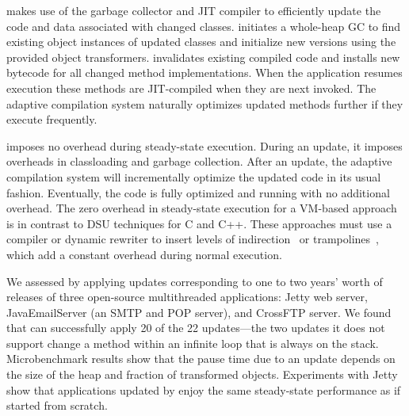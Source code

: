 \DSU{} makes use of the garbage collector and JIT compiler to
efficiently update the code and data associated with changed classes.
\DSU{} initiates a whole-heap GC to find existing object
instances of updated classes and initialize new versions using the
provided object transformers.  \DSU{} invalidates existing compiled 
code and installs new bytecode for all changed method implementations.
When the application resumes execution these methods
are JIT-compiled when they are next invoked.
The adaptive compilation system naturally optimizes updated methods
further if they execute frequently.

\DSU{} imposes no overhead during steady-state execution.  During an
update, it imposes overheads in 
classloading and garbage collection. After an update, the adaptive
compilation system will incrementally optimize the updated code in its
usual fashion.  Eventually, the code is fully optimized and running
with no additional overhead.  The zero overhead in steady-state
execution for a
VM-based approach is in contrast to DSU techniques for C and C++. These
approaches
must use a compiler or dynamic rewriter to insert levels of
indirection~\cite{neamtiu06dsu, orso:java} or
trampolines~\cite{chen06vee,chen:icse07,altekar05opus,ksplice}, which
add a constant overhead during normal execution.

We assessed \DSU{} by applying updates corresponding to
one to two years' worth of releases of three open-source
multithreaded applications: Jetty web server,
JavaEmailServer (an SMTP and POP server), and CrossFTP server.  We
found that \DSU{}
can successfully apply 20 of the 22 updates---the two updates it does
not support change a method within an infinite loop that is always on the
stack.
Microbenchmark results show that the pause time due to an
update depends on the size of the heap and fraction of transformed
objects. 
Experiments
with Jetty show that applications updated by \DSU{} enjoy the same
steady-state performance as if started from scratch.

